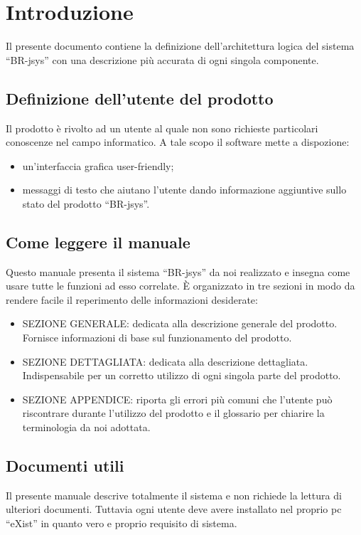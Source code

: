 \documentclass[11pt,titlepage,a4paper]{report}
\begin{document}
\tableofcontents 

\chapter{Introduzione}
Il presente documento contiene la definizione dell'architettura logica del sistema ``BR-jsys'' con una descrizione pi\`u accurata di ogni singola componente.
\section{Definizione dell'utente del prodotto}
Il prodotto \`e rivolto ad un utente al quale non sono richieste particolari conoscenze nel campo informatico. A tale scopo il software mette a dispozione:
\begin{itemize}
\item un'interfaccia grafica user-friendly;
\item messaggi di testo che aiutano l'utente dando informazione aggiuntive sullo stato del prodotto ``BR-jsys''.
\end{itemize}
\section{Come leggere il manuale}
Questo manuale presenta il sistema ``BR-jsys'' da noi realizzato e insegna come usare tutte le funzioni ad esso correlate. \`E organizzato in tre sezioni in modo da rendere facile il reperimento delle informazioni desiderate:
\begin{itemize}
\item SEZIONE GENERALE: dedicata alla descrizione generale del prodotto. Fornisce informazioni di base sul funzionamento del prodotto.
\item SEZIONE DETTAGLIATA: dedicata alla descrizione dettagliata. Indispensabile per un corretto utilizzo di ogni singola parte del prodotto.
\item SEZIONE APPENDICE: riporta gli errori pi\`u comuni che l'utente pu\`o riscontrare durante l'utilizzo del prodotto e il glossario per chiarire la terminologia da noi adottata.
\end{itemize}
\section{Documenti utili}
Il presente manuale descrive totalmente il sistema e non richiede la lettura di ulteriori documenti. Tuttavia ogni utente deve avere installato nel proprio pc ``eXist'' in quanto vero e proprio requisito di sistema. 
\end{document}
